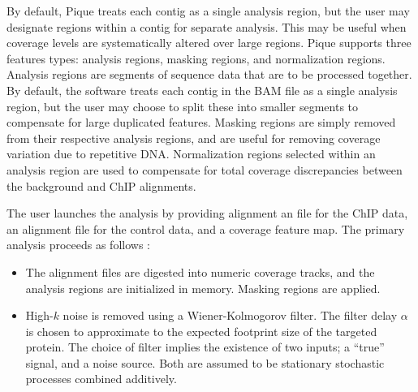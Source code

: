 \begin{refsection}
By default, Pique treats each contig as a single analysis region, but
the user may designate regions within a contig for separate analysis.
This may be useful when coverage levels are systematically altered
over large regions.  Pique supports three features types: analysis
regions, masking regions, and normalization regions. Analysis regions
are segments of sequence data that are to be processed together. By
default, the software treats each contig in the BAM file as a single
analysis region, but the user may choose to split these into smaller
segments to compensate for large duplicated features. Masking regions
are simply removed from their respective analysis regions, and are
useful for removing coverage variation due to repetitive DNA.
Normalization regions selected within an analysis region are used to
compensate for total coverage discrepancies between the background and
ChIP alignments.

The user launches the analysis by providing alignment an file for the
ChIP data, an alignment file for the control data, and a coverage
feature map. The primary analysis proceeds as follows :

\begin{itemize}

\item The alignment files are digested into numeric coverage tracks,
  and the analysis regions are initialized in memory. Masking regions
  are applied.


%

\item High-$k$ noise is removed using a Wiener-Kolmogorov
  filter. \cite{wiener} The filter delay $\alpha$ is chosen to
  approximate to the expected footprint size of the targeted
  protein. The choice of filter implies the existence of two inputs; a
  ``true'' signal, and a noise source. Both are assumed to be
  stationary stochastic processes combined additively.


\end{itemize}
\end{refsection}
